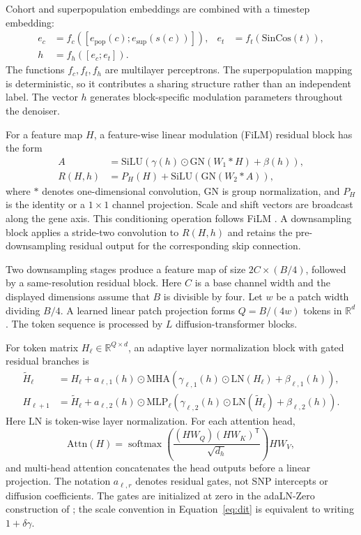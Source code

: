 \documentclass[11pt,a4paper]{article}
\newcommand{\softmax}{\operatorname{softmax}}
\begin{document}
Cohort and superpopulation embeddings are combined with a timestep embedding:
\begin{align}
 e_c&=f_c\!\left([e_{\mathrm{pop}}(c);
                       e_{\mathrm{sup}}(s(c))]\right),
 &e_t&=f_t(\mathrm{SinCos}(t)),\\
 h&=f_h([e_c;e_t]).
 \label{eq:conditioning}
\end{align}
The functions $f_c,f_t,f_h$ are multilayer perceptrons. The superpopulation
mapping is deterministic, so it contributes a sharing structure rather than
an independent label. The vector $h$ generates block-specific modulation
parameters throughout the denoiser.

For a feature map $H$, a feature-wise linear modulation (FiLM) residual block
has the form
\begin{align}
 A&=\mathrm{SiLU}\!\left(
       \gamma(h)\odot\mathrm{GN}(W_1*H)+\beta(h)\right),\\
 R(H,h)&=P_H(H)+\mathrm{SiLU}\!\left(\mathrm{GN}(W_2*A)\right),
 \label{eq:film}
\end{align}
where $*$ denotes one-dimensional convolution, $\mathrm{GN}$ is group
normalization, and $P_H$ is the identity or a $1\times1$ channel projection.
Scale and shift vectors are broadcast along the gene axis. This conditioning
operation follows FiLM \citep{Perez2018}. A downsampling block applies a
stride-two convolution to $R(H,h)$ and retains the pre-downsampling residual
output for the corresponding skip connection.

Two downsampling stages produce a feature map of size
$2C\times(B/4)$, followed by a same-resolution residual block. Here $C$ is a
base channel width and the displayed dimensions assume that $B$ is divisible
by four. Let $w$ be a patch width dividing $B/4$. A learned linear patch
projection forms $Q=B/(4w)$ tokens in $\mathbb R^d$. The token sequence is
processed by $L$ diffusion-transformer blocks.

For token matrix $H_\ell\in\mathbb R^{Q\times d}$, an adaptive layer
normalization block with gated residual branches is
\begin{align}
 \widetilde H_\ell
 &=H_\ell+a_{\ell,1}(h)\odot
   \mathrm{MHA}\!\left(
     \gamma_{\ell,1}(h)\odot\mathrm{LN}(H_\ell)
                          +\beta_{\ell,1}(h)\right),\\
 H_{\ell+1}
 &=\widetilde H_\ell+a_{\ell,2}(h)\odot
   \mathrm{MLP}_{\ell}\!\left(
     \gamma_{\ell,2}(h)\odot\mathrm{LN}(\widetilde H_\ell)
                          +\beta_{\ell,2}(h)\right).
 \label{eq:dit}
\end{align}
Here $\mathrm{LN}$ is token-wise layer normalization. For each attention head,
\begin{equation}
 \mathrm{Attn}(H)
 =\softmax\!\left(\frac{(HW_Q)(HW_K)^{\mathsf T}}{\sqrt{d_h}}\right)HW_V,
 \label{eq:attention}
\end{equation}
and multi-head attention concatenates the head outputs before a linear
projection. The notation $a_{\ell,r}$ denotes residual gates, not SNP
intercepts or diffusion coefficients. The gates are initialized at zero in
the adaLN-Zero construction of \citet{Peebles2023}; the scale convention in
Equation~\eqref{eq:dit} is equivalent to writing $1+\delta\gamma$.
\end{document}
